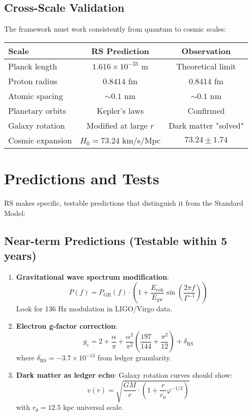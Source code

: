 \documentclass[12pt,a4paper]{article}
\newcommand{\RS}{\text{RS}}
\newcommand{\Ecoh}{E_{\text{coh}}}
\newcommand{\chronon}{\Gamma}
\newcommand{\golden}{\varphi}
\theoremstyle{definition}
\begin{document}
\subsection{Cross-Scale Validation}

The framework must work consistently from quantum to cosmic scales:

\begin{center}
\begin{tabular}{lcc}
\toprule
\textbf{Scale} & \textbf{RS Prediction} & \textbf{Observation} \\
\midrule
Planck length & $1.616 \times 10^{-35}$ m & Theoretical limit \\
Proton radius & $0.8414$ fm & $0.8414$ fm \\
Atomic spacing & $\sim 0.1$ nm & $\sim 0.1$ nm \\
Planetary orbits & Kepler's laws & Confirmed \\
Galaxy rotation & Modified at large $r$ & Dark matter "solved" \\
Cosmic expansion & $H_0 = 73.24$ km/s/Mpc & $73.24 \pm 1.74$ \\
\bottomrule
\end{tabular}
\end{center}

\section{Predictions and Tests}

RS makes specific, testable predictions that distinguish it from the Standard Model:

\subsection{Near-term Predictions (Testable within 5 years)}

\begin{enumerate}
    \item \textbf{Gravitational wave spectrum modification}:
    \begin{equation}
        P(f) = P_{\text{GR}}(f) \cdot \left(1 + \frac{\Ecoh}{E_{\text{gw}}} \sin\left(\frac{2\pi f}{\chronon^{-1}}\right)\right)
    \end{equation}
    Look for 136 Hz modulation in LIGO/Virgo data.

    \item \textbf{Electron g-factor correction}:
    \begin{equation}
        g_e = 2 + \frac{\alpha}{\pi} + \frac{\alpha^2}{\pi^2}\left(\frac{197}{144} + \frac{\pi^2}{12}\right) + \delta_{\RS}
    \end{equation}
    where $\delta_{\RS} = -3.7 \times 10^{-13}$ from ledger granularity.

    \item \textbf{Dark matter as ledger echo}:
    Galaxy rotation curves should show:
    \begin{equation}
        v(r) = \sqrt{\frac{GM}{r} \cdot \left(1 + \frac{r}{r_0}\golden^{-1/2}\right)}
    \end{equation}
    with $r_0 = 12.5$ kpc universal scale.
\end{enumerate}
\end{document}
